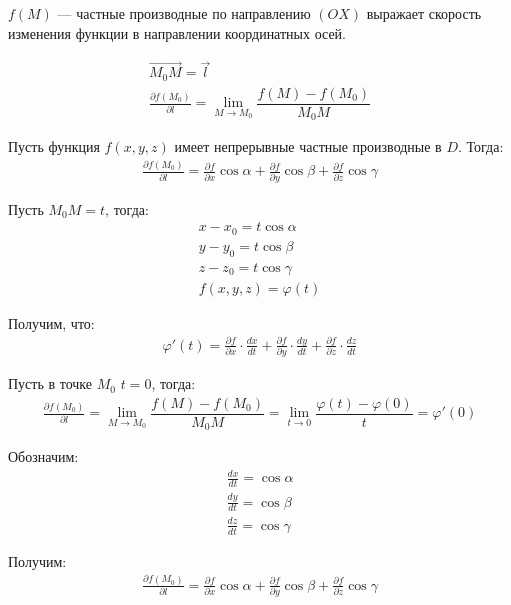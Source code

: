 \documentclass[a4paper,12pt,oneside]{extbook}
\theoremstyle{numbered}
\theoremstyle{unnumbered}
\theoremstyle{named}
\theoremstyle{unnumbered}
\theoremstyle{named}
\theoremstyle{named}
\theoremstyle{named}
\begin{document}
\(f(M)\) — частные производные по направлению \((OX)\) выражает скорость изменения функции в направлении координатных осей.

\begin{gather*}
    \overrightarrow{M_0 M} = \overrightarrow{l} \\
    \frac{\partial f(M_0)}{\partial l} = \lim_{M \to M_0}{\dfrac{f(M) - f(M_0)}{M_0M}}
\end{gather*}

Пусть функция \(f(x, y, z)\) имеет непрерывные частные производные в \(D\). Тогда:
\begin{gather*}
    \frac{\partial f(M_0)}{\partial l} = \frac{\partial f}{\partial x} \cos{\alpha} + \frac{\partial f}{\partial y} \cos{\beta} + \frac{\partial f}{\partial z} \cos{\gamma}
\end{gather*}

Пусть \(M_0M = t\), тогда:
\begin{gather*}
    x - x_0 = t\cos{\alpha} \\
    y - y_0 = t\cos{\beta} \\
    z - z_0 = t\cos{\gamma} \\
    f(x, y, z) = \varphi(t)
\end{gather*}

Получим, что:
\begin{gather*}
    \varphi'(t) = \frac{\partial f}{\partial x} \cdot \frac{dx}{dt} + \frac{\partial f}{\partial y} \cdot \frac{dy}{dt} + \frac{\partial f}{\partial z} \cdot \frac{dz}{dt}
\end{gather*}

Пусть в точке \(M_0\) \(t = 0\), тогда:
\begin{gather*}
    \frac{\partial f(M_0)}{\partial l} = \lim_{M \to M_0}{\dfrac{f(M) - f(M_0)}{M_0M}} = \lim_{t \to 0}{\dfrac{\varphi(t) - \varphi(0)}{t}} = \varphi'(0)
\end{gather*}

Обозначим:
\begin{gather*}
    \frac{dx}{dt} = \cos{\alpha} \\
    \frac{dy}{dt} = \cos{\beta} \\
    \frac{dz}{dt} = \cos{\gamma}
\end{gather*}

Получим:
\begin{gather*}
    \frac{\partial f(M_0)}{\partial l} = \frac{\partial f}{\partial x} \cos{\alpha} + \frac{\partial f}{\partial y} \cos{\beta} + \frac{\partial f}{\partial z} \cos{\gamma}
\end{gather*}
\end{document}

